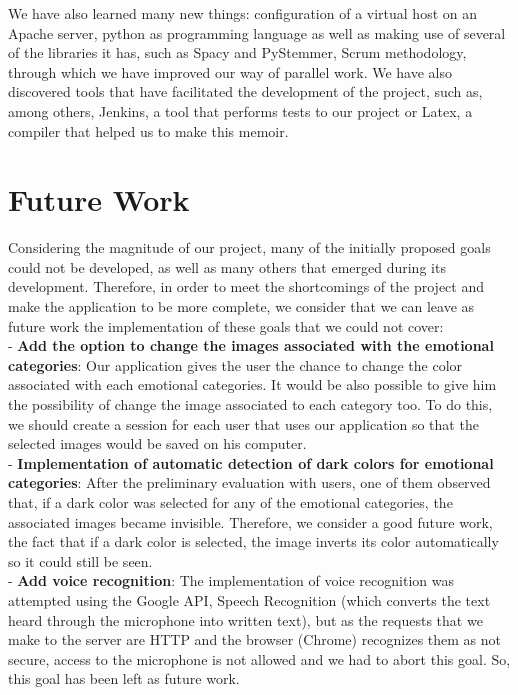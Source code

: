 We have also learned many new things: configuration of a virtual host on an Apache server, python as programming language as well as making use of several of the libraries it has, such as Spacy and PyStemmer, Scrum methodology, through which we have improved our way of parallel work. We have also discovered tools that have facilitated the development of the project, such as, among others, Jenkins, a tool that performs tests to our project or Latex, a compiler that helped us to make this memoir.

\section{Future Work}
\label{cap12:sec:trabajo futuro}

Considering the magnitude of our project, many of the initially proposed goals could not be developed, as well as many others that emerged during its development.
Therefore, in order to meet the shortcomings of the project and make the application to be more complete, we consider that we can leave as future work the implementation of these goals that we could not cover:\\



- \textbf{Add the option to change the images associated with the emotional categories}: Our application gives the user the chance to change the color associated with each emotional categories. It would be also possible to give him the possibility of change the image associated to each category too. To do this, we should create a session for each user that uses our application so that the selected images would be saved on his computer.\\


- \textbf{Implementation of automatic detection of dark colors for emotional categories}: After the preliminary evaluation with users, one of them observed that, if a dark color was selected for any of the emotional categories, the associated images became invisible. Therefore, we consider a good future work, the fact that if a dark color is selected, the image inverts its color automatically so it could still be seen.\\ 



- \textbf{Add voice recognition}: The implementation of voice recognition was attempted using the Google API, Speech Recognition (which converts the text heard through the microphone into written text), but as the requests that we make to the server are HTTP and the browser (Chrome) recognizes them as not secure, access to the microphone is not allowed and we had to abort this goal. So, this goal has been left as future work.\\



